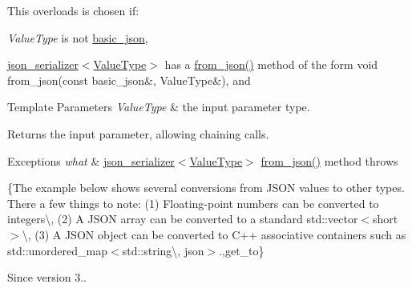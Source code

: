 This overloads is chosen if\+:
\begin{DoxyItemize}
\item {\itshape Value\+Type} is not \hyperlink{classnlohmann_1_1basic__json}{basic\+\_\+json},
\item \hyperlink{classnlohmann_1_1basic__json_a7768841baaaa7a21098a401c932efaff}{json\+\_\+serializer$<$\+Value\+Type$>$} has a {\ttfamily \hyperlink{namespacenlohmann_1_1anonymous__namespace_02from__json_8hpp_03_a8da2cbc27f4ff99aff5c20428fbcce4c}{from\+\_\+json()}} method of the form {\ttfamily void from\+\_\+json(const basic\+\_\+json\&, Value\+Type\&)}, and
\end{DoxyItemize}


\begin{DoxyTemplParams}{Template Parameters}
{\em Value\+Type} & the input parameter type.\\
\hline
\end{DoxyTemplParams}
\begin{DoxyReturn}{Returns}
the input parameter, allowing chaining calls.
\end{DoxyReturn}

\begin{DoxyExceptions}{Exceptions}
{\em what} & \hyperlink{classnlohmann_1_1basic__json_a7768841baaaa7a21098a401c932efaff}{json\+\_\+serializer$<$\+Value\+Type$>$} {\ttfamily \hyperlink{namespacenlohmann_1_1anonymous__namespace_02from__json_8hpp_03_a8da2cbc27f4ff99aff5c20428fbcce4c}{from\+\_\+json()}} method throws\\
\hline
\end{DoxyExceptions}
\{The example below shows several conversions from J\+S\+ON values to other types. There a few things to note\+: (1) Floating-\/point numbers can be converted to integers\textbackslash{}, (2) A J\+S\+ON array can be converted to a standard {\ttfamily std\+::vector$<$short$>$}\textbackslash{}, (3) A J\+S\+ON object can be converted to C++ associative containers such as {\ttfamily std\+::unordered\+\_\+map$<$std\+::string\textbackslash{}, json$>$}.,get\+\_\+to\}

\begin{DoxySince}{Since}
version 3.. 
\end{DoxySince}
